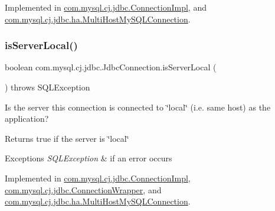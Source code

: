 Implemented in \mbox{\hyperlink{classcom_1_1mysql_1_1cj_1_1jdbc_1_1_connection_impl_a0eec8abab54aa4e2f6789b0d3db561e4}{com.\+mysql.\+cj.\+jdbc.\+Connection\+Impl}}, and \mbox{\hyperlink{classcom_1_1mysql_1_1cj_1_1jdbc_1_1ha_1_1_multi_host_my_s_q_l_connection_a47d81e605bf65122771ecb727b6177ed}{com.\+mysql.\+cj.\+jdbc.\+ha.\+Multi\+Host\+My\+S\+Q\+L\+Connection}}.

\mbox{\label{interfacecom_1_1mysql_1_1cj_1_1jdbc_1_1_jdbc_connection_a4418f89cdbd768f892b6ef7823107921}} 
\subsubsection{\texorpdfstring{is\+Server\+Local()}{isServerLocal()}}
{\footnotesize\ttfamily boolean com.\+mysql.\+cj.\+jdbc.\+Jdbc\+Connection.\+is\+Server\+Local (\begin{DoxyParamCaption}{ }\end{DoxyParamCaption}) throws S\+Q\+L\+Exception}

Is the server this connection is connected to \char`\"{}local\char`\"{} (i.\+e. same host) as the application?

\begin{DoxyReturn}{Returns}
true if the server is \char`\"{}local\char`\"{} 
\end{DoxyReturn}

\begin{DoxyExceptions}{Exceptions}
{\em S\+Q\+L\+Exception} & if an error occurs \\
\hline
\end{DoxyExceptions}


Implemented in \mbox{\hyperlink{classcom_1_1mysql_1_1cj_1_1jdbc_1_1_connection_impl_a9f0926c4f30516633878b4315f7c073c}{com.\+mysql.\+cj.\+jdbc.\+Connection\+Impl}}, \mbox{\hyperlink{classcom_1_1mysql_1_1cj_1_1jdbc_1_1_connection_wrapper_afe8fab04e181ccd81e0e5bb3881361cd}{com.\+mysql.\+cj.\+jdbc.\+Connection\+Wrapper}}, and \mbox{\hyperlink{classcom_1_1mysql_1_1cj_1_1jdbc_1_1ha_1_1_multi_host_my_s_q_l_connection_ae6f52873381a19395473dd957c756ee7}{com.\+mysql.\+cj.\+jdbc.\+ha.\+Multi\+Host\+My\+S\+Q\+L\+Connection}}.

